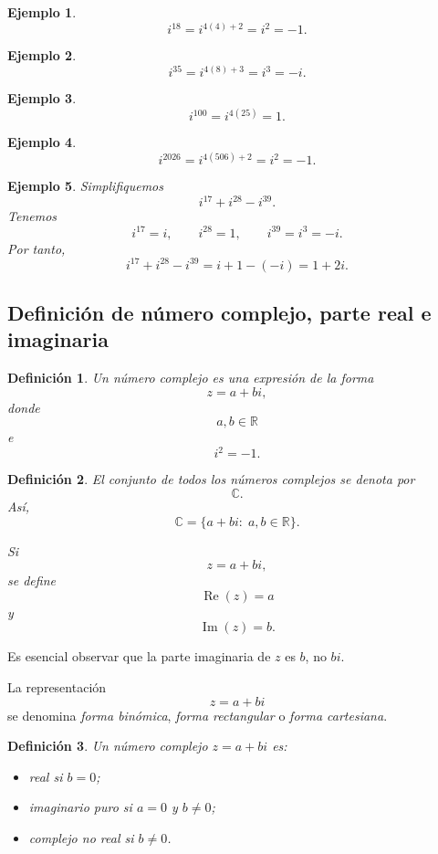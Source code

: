 \documentclass[12pt]{article}
\newtheorem{Ejem}{Ejemplo}
\newtheorem{Def}{Definici\'on}
\begin{document}
\begin{Ejem}

\[
i^{18}=i^{4(4)+2}=i^2=-1.
\]
\end{Ejem}

\begin{Ejem}
\[
i^{35}=i^{4(8)+3}=i^3=-i.
\]
\end{Ejem}

\begin{Ejem}
\[
i^{100}=i^{4(25)}=1.
\]
\end{Ejem}

\begin{Ejem}
\[
i^{2026}=i^{4(506)+2}=i^2=-1.
\]
\end{Ejem}

\begin{Ejem}
Simplifiquemos
\[
i^{17}+i^{28}-i^{39}.
\]
Tenemos
\[
i^{17}=i,\qquad
i^{28}=1,\qquad
i^{39}=i^3=-i.
\]
Por tanto,
\[
i^{17}+i^{28}-i^{39}
=i+1-(-i)
=
\boxed{1+2i}.
\]
\end{Ejem}


\subsection*{Definición de número complejo, parte real e imaginaria}

\begin{Def}
Un número complejo es una expresión de la forma
\[
\boxed{z=a+bi,}
\]
donde
\[
a,b\in\mathbb{R}
\]
e
\[
i^2=-1.
\]
\end{Def}

\begin{Def}
El conjunto de todos los números complejos se denota por
\[
\boxed{\mathbb{C}}.
\]
Así,
\[
\boxed{
\mathbb{C}
=
\{a+bi:\;a,b\in\mathbb{R}\}.
}
\]

Si
\[
z=a+bi,
\]
se define
\[
\boxed{\operatorname{Re}(z)=a}
\]
y
\[
\boxed{\operatorname{Im}(z)=b.}
\]
\end{Def}
Es esencial observar que la parte imaginaria de $z$ es $b$, no $bi$.

La representación
\[
z=a+bi
\]
se denomina \emph{forma binómica}, \emph{forma rectangular} o
\emph{forma cartesiana}.

\begin{Def}
Un número complejo $z=a+bi$ es:
\begin{itemize}
    \item real si $b=0$;
    \item imaginario puro si $a=0$ y $b\neq 0$;
    \item complejo no real si $b\neq 0$.
\end{itemize}
\end{Def}
\end{document}
